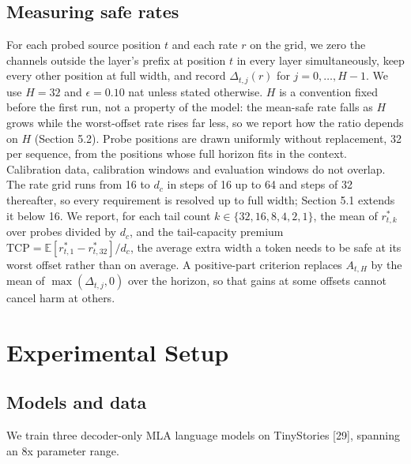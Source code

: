 \documentclass[10pt]{article}
\begin{document}
\subsection{Measuring safe rates}

For each probed source position $t$ and each rate $r$ on the grid, we zero the channels outside the layer's prefix at position $t$ in every layer simultaneously, keep every other position at full width, and record $\Delta_{t,j}(r)$ for $j=0,\ldots,H-1$. We use $H=32$ and $\epsilon=0.10$ nat unless stated otherwise. $H$ is a convention fixed before the first run, not a property of the model: the mean-safe rate falls as $H$ grows while the worst-offset rate rises far less, so we report how the ratio depends on $H$ (Section 5.2). Probe positions are drawn uniformly without replacement, 32 per sequence, from the positions whose full horizon fits in the context. Calibration data, calibration windows and evaluation windows do not overlap. The rate grid runs from 16 to $d_c$ in steps of 16 up to 64 and steps of 32 thereafter, so every requirement is resolved up to full width; Section 5.1 extends it below 16. We report, for each tail count $k\in\{32,16,8,4,2,1\}$, the mean of $r^*_{t,k}$ over probes divided by $d_c$, and the tail-capacity premium $\mathrm{TCP}=\mathbb E[r^*_{t,1}- r^*_{t,32}]/d_c$, the average extra width a token needs to be safe at its worst offset rather than on average. A positive-part criterion replaces $A_{t,H}$ by the mean of $\max(\Delta_{t,j},0)$ over the horizon, so that gains at some offsets cannot cancel harm at others.

\section{Experimental Setup}

\subsection{Models and data}

We train three decoder-only MLA language models on TinyStories [29], spanning an 8x parameter range.

\begin{table}[t]
\centering
\caption{The three MLA language models trained for this study, all on TinyStories.}
\end{table}
\end{document}
